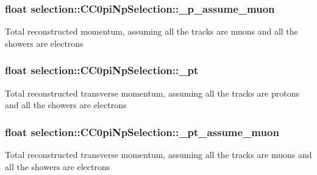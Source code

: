 \subsubsection[{\texorpdfstring{\+\_\+p\+\_\+assume\+\_\+muon}{_p_assume_muon}}]{\setlength{\rightskip}{0pt plus 5cm}float selection\+::\+C\+C0pi\+Np\+Selection\+::\+\_\+p\+\_\+assume\+\_\+muon\hspace{0.3cm}{\ttfamily [private]}}\hypertarget{classselection_1_1CC0piNpSelection_a2e861bf5b394c18e24f58d9fef5c33a5}{}\label{classselection_1_1CC0piNpSelection_a2e861bf5b394c18e24f58d9fef5c33a5}
Total reconstructed momentum, assuming all the tracks are muons and all the showers are electrons 
\subsubsection[{\texorpdfstring{\+\_\+pt}{_pt}}]{\setlength{\rightskip}{0pt plus 5cm}float selection\+::\+C\+C0pi\+Np\+Selection\+::\+\_\+pt\hspace{0.3cm}{\ttfamily [private]}}\hypertarget{classselection_1_1CC0piNpSelection_a98281b58b33ff8c03fa9b00f3f3baa06}{}\label{classselection_1_1CC0piNpSelection_a98281b58b33ff8c03fa9b00f3f3baa06}
Total reconstructed transverse momentum, assuming all the tracks are protons and all the showers are electrons 
\subsubsection[{\texorpdfstring{\+\_\+pt\+\_\+assume\+\_\+muon}{_pt_assume_muon}}]{\setlength{\rightskip}{0pt plus 5cm}float selection\+::\+C\+C0pi\+Np\+Selection\+::\+\_\+pt\+\_\+assume\+\_\+muon\hspace{0.3cm}{\ttfamily [private]}}\hypertarget{classselection_1_1CC0piNpSelection_a4213e006ba267c2ff55415cc9ef07bf8}{}\label{classselection_1_1CC0piNpSelection_a4213e006ba267c2ff55415cc9ef07bf8}
Total reconstructed transverse momentum, assuming all the tracks are muons and all the showers are electrons 
